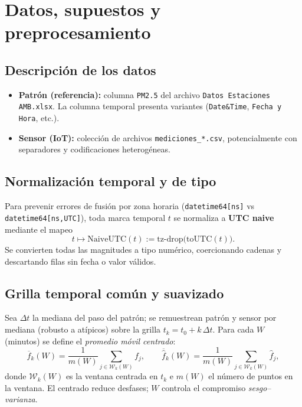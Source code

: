 \documentclass[11pt,a4paper]{article}
\newcommand{\PMcol}{PM2.5}     %
\begin{document}
\section{Datos, supuestos y preprocesamiento}
\subsection{Descripción de los datos}
\begin{itemize}[leftmargin=1.2em]
  \item \textbf{Patrón (referencia):} columna \texttt{\PMcol} del archivo \texttt{Datos Estaciones AMB.xlsx}. La columna temporal presenta variantes (\texttt{Date\&Time}, \texttt{Fecha y Hora}, etc.).
  \item \textbf{Sensor (IoT):} colección de archivos \texttt{mediciones\_*.csv}, potencialmente con separadores y codificaciones heterogéneas.
\end{itemize}

\subsection{Normalización temporal y de tipo}
Para prevenir errores de fusión por zona horaria (\verb|datetime64[ns]| vs \verb|datetime64[ns,UTC]|), toda marca temporal $t$ se normaliza a \textbf{UTC naive} mediante el mapeo
\begin{equation}
t \mapsto \mathrm{NaiveUTC}(t) := \mathrm{tz\mbox{-}drop}\big(\mathrm{toUTC}(t)\big).
\end{equation}
Se convierten todas las magnitudes a tipo numérico, coercionando cadenas y descartando filas sin fecha o valor válidos.

\subsection{Grilla temporal común y suavizado}
Sea $\Delta t$ la mediana del paso del patrón; se remuestrean patrón y sensor por mediana (robusto a atípicos) sobre la grilla $t_k=t_0+k\,\Delta t$. Para cada $W$ (minutos) se define el \emph{promedio móvil centrado}:
\begin{equation}
\overline{f}_k(W)=\frac{1}{m(W)}\sum_{j\in \mathcal{W}_k(W)} f_j,\qquad
\overline{\hat f}_k(W)=\frac{1}{m(W)}\sum_{j\in \mathcal{W}_k(W)} \hat f_j,
\end{equation}
donde $\mathcal{W}_k(W)$ es la ventana centrada en $t_k$ e $m(W)$ el número de puntos en la ventana.
El centrado reduce desfases; $W$ controla el compromiso \emph{sesgo--varianza}.
\end{document}
